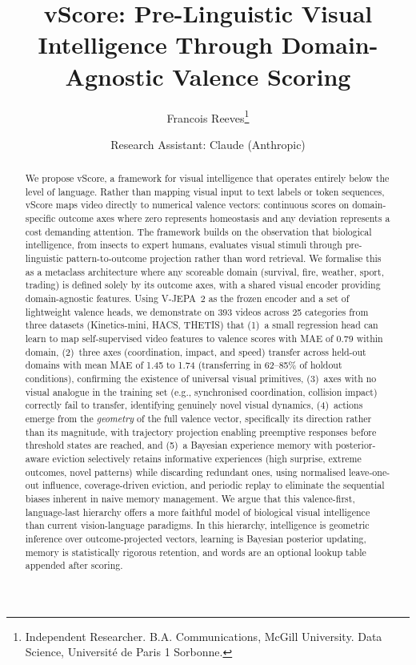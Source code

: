 \documentclass[11pt]{article}
\title{vScore: Pre-Linguistic Visual Intelligence Through Domain-Agnostic Valence Scoring}
\author{Francois Reeves\thanks{Independent Researcher. B.A. Communications, McGill University. Data Science, Universit\'{e} de Paris 1 Sorbonne.} \and Research Assistant: Claude (Anthropic)}
\date{}
\begin{document}
\maketitle

\begin{abstract}
We propose vScore, a framework for visual intelligence that operates entirely below the level of language. Rather than mapping visual input to text labels or token sequences, vScore maps video directly to numerical valence vectors: continuous scores on domain-specific outcome axes where zero represents homeostasis and any deviation represents a cost demanding attention. The framework builds on the observation that biological intelligence, from insects to expert humans, evaluates visual stimuli through pre-linguistic pattern-to-outcome projection rather than word retrieval. We formalise this as a metaclass architecture where any scoreable domain (survival, fire, weather, sport, trading) is defined solely by its outcome axes, with a shared visual encoder providing domain-agnostic features. Using V-JEPA~2 as the frozen encoder and a set of lightweight valence heads, we demonstrate on 393 videos across 25 categories from three datasets (Kinetics-mini, HACS, THETIS) that (1)~a small regression head can learn to map self-supervised video features to valence scores with MAE of 0.79 within domain, (2)~three axes (coordination, impact, and speed) transfer across held-out domains with mean MAE of 1.45 to 1.74 (transferring in 62--85\% of holdout conditions), confirming the existence of universal visual primitives, (3)~axes with no visual analogue in the training set (e.g., synchronised coordination, collision impact) correctly fail to transfer, identifying genuinely novel visual dynamics, (4)~actions emerge from the \emph{geometry} of the full valence vector, specifically its direction rather than its magnitude, with trajectory projection enabling preemptive responses before threshold states are reached, and (5)~a Bayesian experience memory with posterior-aware eviction selectively retains informative experiences (high surprise, extreme outcomes, novel patterns) while discarding redundant ones, using normalised leave-one-out influence, coverage-driven eviction, and periodic replay to eliminate the sequential biases inherent in naive memory management. We argue that this valence-first, language-last hierarchy offers a more faithful model of biological visual intelligence than current vision-language paradigms. In this hierarchy, intelligence is geometric inference over outcome-projected vectors, learning is Bayesian posterior updating, memory is statistically rigorous retention, and words are an optional lookup table appended after scoring.
\end{abstract}
\end{document}
